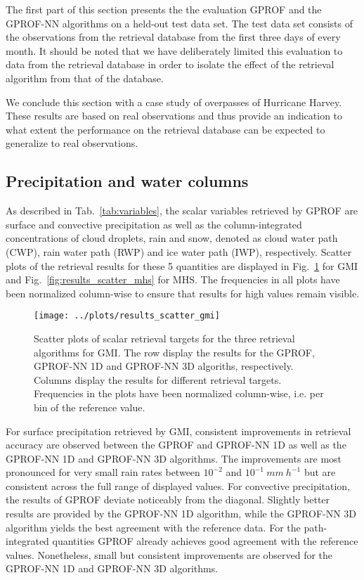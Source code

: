 \documentclass[a4paper,11pt,bibtotoc]{scrartcl}
\begin{document}
The first part of this section presents the the evaluation GPROF and the
GPROF-NN algorithms on a held-out test data set. The test data set consists of
the observations from the retrieval database from the first three days of every
month. It should be noted that we have deliberately limited this evaluation to
data from the retrieval database in order to isolate the effect of the retrieval
algorithm from that of the database.

We conclude this section with a case study of overpasses of Hurricane Harvey.
These results are based on real observations and thus provide an indication to
what extent the performance on the retrieval database can be expected to
generalize to real observations.

\subsection{Precipitation and water columns}

As described in Tab.~\ref{tab:variables}, the scalar variables retrieved by
GPROF are surface and convective precipitation as well as the column-integrated
concentrations of cloud droplets, rain and snow, denoted as cloud water path
(CWP), rain water path (RWP) and ice water path (IWP), respectively. Scatter
plots of the retrieval results for these 5 quantities are displayed in
Fig.~\ref{fig:results_scatter_gmi} for GMI and
Fig.~\ref{fig:results_scatter_mhs} for MHS. The frequencies in all plots have
been normalized column-wise to ensure that results for high  values
remain visible.

\begin{figure}[hbpt]
  \centering
  \texttt{[image: ../plots/results\_scatter\_gmi]}
  \caption{
    Scatter plots of scalar retrieval targets for the three retrieval algorithms
    for GMI. The row display the results for the GPROF, GPROF-NN 1D and GPROF-NN
    3D algoriths, respectively. Columns display the results for different
    retrieval targets. Frequencies in the plots have been normalized
    column-wise, i.e. per bin of the reference value.
  }
  \label{fig:results_scatter_gmi}
\end{figure}

For surface precipitation retrieved by GMI, consistent improvements in retrieval
accuracy are observed between the GPROF and GPROF-NN 1D as well as the GPROF-NN
1D and GPROF-NN 3D algorithms. The improvements are most pronounced for very
small rain rates between $10^{-2}$ and $10^{-1}\ \unit{mm\ h^{-1}}$ but are
consistent across the full range of displayed values. For convective
precipitation, the results of GPROF deviate noticeably from the diagonal.
Slightly better results are provided by the GPROF-NN 1D algorithm, while the
GPROF-NN 3D algorithm yields the best agreement with the reference data. For the
path-integrated quantities GPROF already achieves good agreement with the
reference values. Nonetheless, small but consistent improvements are observed
for the GPROF-NN 1D and GPROF-NN 3D algorithms.
\end{document}
